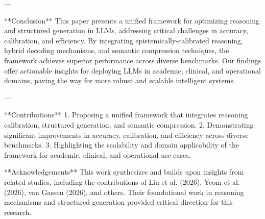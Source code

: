 ---

**Conclusion**  
This paper presents a unified framework for optimizing reasoning and structured generation in LLMs, addressing critical challenges in accuracy, calibration, and efficiency. By integrating epistemically-calibrated reasoning, hybrid decoding mechanisms, and semantic compression techniques, the framework achieves superior performance across diverse benchmarks. Our findings offer actionable insights for deploying LLMs in academic, clinical, and operational domains, paving the way for more robust and scalable intelligent systems.  

---

**Contributions**  
1. Proposing a unified framework that integrates reasoning calibration, structured generation, and semantic compression.  
2. Demonstrating significant improvements in accuracy, calibration, and efficiency across diverse benchmarks.  
3. Highlighting the scalability and domain applicability of the framework for academic, clinical, and operational use cases.  

**Acknowledgements**  
This work synthesizes and builds upon insights from related studies, including the contributions of Liu et al. (2026), Yeom et al. (2026), van Gassen (2026), and others. Their foundational work in reasoning mechanisms and structured generation provided critical direction for this research.